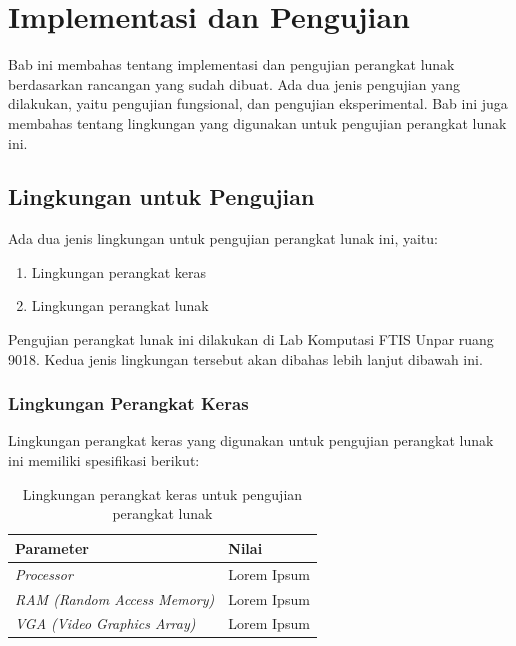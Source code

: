 \chapter{Implementasi dan Pengujian}
\label{chap:implementasipengujian}

Bab ini membahas tentang implementasi dan pengujian perangkat lunak berdasarkan rancangan yang sudah dibuat. Ada dua jenis pengujian yang dilakukan, yaitu pengujian fungsional, dan pengujian eksperimental. Bab ini juga membahas tentang lingkungan yang digunakan untuk pengujian perangkat lunak ini.

\section{Lingkungan untuk Pengujian}
\label{sec:lingkunganpengujian}

Ada dua jenis lingkungan untuk pengujian perangkat lunak ini, yaitu:

\begin{enumerate}
\item Lingkungan perangkat keras
\item Lingkungan perangkat lunak
\end{enumerate}

Pengujian perangkat lunak ini dilakukan di Lab Komputasi FTIS Unpar ruang 9018. Kedua jenis lingkungan tersebut akan dibahas lebih lanjut dibawah ini.

\subsection{Lingkungan Perangkat Keras}
\label{sec:lingkunganpk}

Lingkungan perangkat keras yang digunakan untuk pengujian perangkat lunak ini memiliki spesifikasi berikut:

\begin{table}
\centering
\captionsetup{justification=centering}
\caption[Lingkungan perangkat keras untuk pengujian perangkat lunak]{Lingkungan perangkat keras untuk pengujian perangkat lunak}
\begin{tabular}{| l | l |}
\hline
Parameter & Nilai \\
\hline \hline
\textit{Processor} & Lorem Ipsum \\
\hline
\textit{RAM (Random Access Memory)} & Lorem Ipsum \\
\hline
\textit{VGA (Video Graphics Array)} & Lorem Ipsum \\
\hline
\end{tabular}
\label{tab:lingkunganpk}
\end{table}

